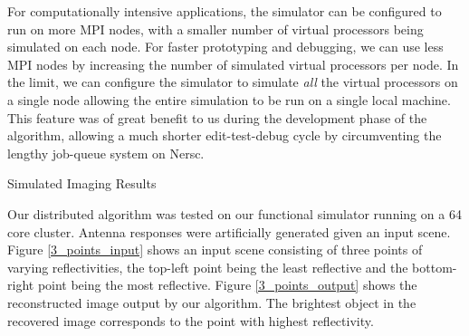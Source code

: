 \documentclass[twocolumn]{article}
\makeatletter
\def\section{\@startsection{section}{1}{\z@}{24pt plus 2 pt
minus 2 pt} {12pt plus 2pt minus 2pt}{\large\bf}}
\makeatother
\begin{document}
For computationally intensive applications, the simulator can be configured to run on more MPI nodes, with a smaller number of virtual processors being simulated on each node. For faster prototyping and debugging, we can use less MPI nodes by increasing the number of simulated virtual processors per node. In the limit, we can configure the simulator to simulate {\em all} the virtual processors on a single node allowing the entire simulation to be run on a single local machine. This feature was of great benefit to us during the development phase of the algorithm, allowing a much shorter edit-test-debug cycle by circumventing the lengthy job-queue system on Nersc. 

\section{Simulated Imaging Results}

Our distributed algorithm was tested on our functional simulator running on a 64 core cluster. Antenna responses were artificially generated given an input scene. Figure \ref{3_points_input} shows an input scene consisting of three points of varying reflectivities, the top-left point being the least reflective and the bottom-right point being the most reflective. Figure \ref{3_points_output} shows the reconstructed image output by our algorithm. The brightest object in the recovered image corresponds to the point with highest reflectivity. 
\end{document}

